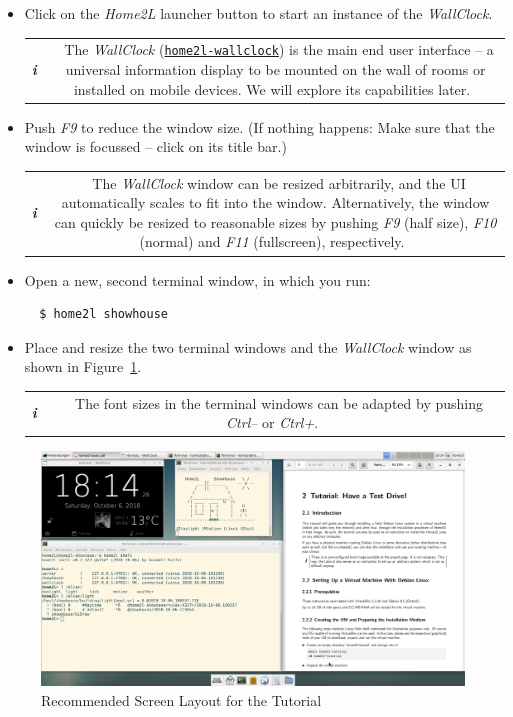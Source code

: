 \documentclass[12pt,english,parskip=half]{scrreprt}
\newcommand{\infobox}[1]{
  \hfill
  \setlength\arrayrulewidth{1pt}
  \begin{tabular}[t]{c|c|}
    \parbox{1.8em}{\hfill\textit{\Huge\textbf{i}\,}}
    &
    \,\parbox{0.89\linewidth}{\setlength{\parskip}{0.5em}#1}\,
  \end{tabular}
  \par
}
\newcommand{\idx}[1]{#1\index{#1}}
\newcommand{\toolref}[1]{\hyperref[tool:#1]{\texttt{\idx{#1}}}}
\begin{document}
\begin{itemize}[$\blacktriangleright$]

\item
  Click on the \emph{Home2L} launcher button to start an instance of the
  \emph{WallClock}.

  \infobox{
    The \emph{WallClock} (\toolref{home2l-wallclock}) is the main end user interface --
    a universal information display to be mounted on the wall of rooms or installed on mobile devices.
    We will explore its capabilities later.
  }

\item
  Push \emph{F9} to reduce the window size. (If nothing happens: Make
  sure that the window is focussed -- click on its title bar.)

  \infobox{
    The \emph{WallClock} window can be resized arbitrarily, and the UI automatically
    scales to fit into the window. Alternatively, the window can quickly be resized to
    reasonable sizes by pushing \textit{F9} (half size), \textit{F10} (normal) and
    \textit{F11} (fullscreen), respectively.
  }

\item
  Open a new, second terminal window, in which you run:
  \begin{lstlisting}
  $ home2l showhouse
  \end{lstlisting}

\item
  Place and resize the two terminal windows and the \emph{WallClock} window
  as shown in Figure~\ref{fig:screen-layout}.

  \infobox{
    The font sizes in the terminal windows can be adapted by pushing \textit{Ctrl--} or \textit{Ctrl+}.
  }

\end{itemize}


\begin{figure}[ht]
  \centering
  \includegraphics[width=0.95\linewidth,keepaspectratio]{figs/screen-tutorial_layout}
  \caption[l]{Recommended Screen Layout for the Tutorial}
  \label{fig:screen-layout}
\end{figure}
\end{document}
